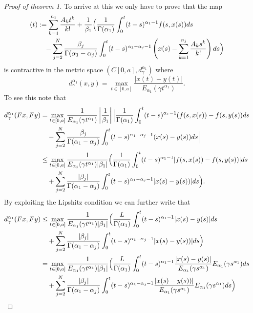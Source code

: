 \documentclass{article}
\begin{document}
\begin{proof}[Proof of theorem 1]

	To arrive at this we only have to prove that the map
	\begin{align*}
		[Fx](t) &:= \sum_{k=1}^{n_1}\frac{A_kt^k}{k!} + \frac{1}{\beta_1} \Bigl( \frac{1}{\Gamma(\alpha_1)}\int_{0}^{t} (t-s)^{\alpha_1 - 1}f(s,x(s))ds \\
			& \ \ \ - \sum_{j=2}^{N} \frac{\beta_j}{\Gamma(\alpha_1 - \alpha_j)}\int_{0}^{t}(t-s)^{\alpha_1 - \alpha_j - 1}\left(x(s) - \sum_{k=1}^{n_j}\frac{A_ks^k}{k!} \right) ds \Bigr)
	\end{align*}
	is contractive in the metric space $ \left( C[0,a], d^{\alpha_1}_\gamma \right) $ where 
	$$ d_\gamma^{\alpha_1}(x,y) = \max_{t \in [0, a]} \frac{|x(t) - y(t)|}{E_{\alpha_1}(\gamma t^{\alpha_1})}. $$
	To see this note that
	\begin{align*}
		d_\gamma^{\alpha_1}(Fx,Fy) &= \max_{t \in [0, a]}  \frac{1}{E_{\alpha_1}(\gamma t^{\alpha_1})} 
			\left| \frac{1}{\beta_1} \right| \Bigl| \frac{1}{\Gamma(\alpha_1)}\int_0^t (t-s)^{\alpha_1 - 1} (f(s,x(s)) - f(s,y(s))ds \\ 
			& \ \ \ - \sum_{j=2}^N \frac{\beta_j}{\Gamma(\alpha_1 - \alpha_j)} \int_0^t (t-s)^{\alpha_1 - \alpha_j - 1}(x(s) - y(s)) ds \Bigr| \\
			&\leq \max_{t \in [0, a]} \frac{1}{E_{\alpha_1}(\gamma t^{\alpha_1}) | \beta_1 |} \Big(
			 \frac{1}{\Gamma(\alpha_1)}\int_0^t (t-s)^{\alpha_1 - 1} |f(s,x(s)) - f(s,y(s))|ds \\ 
			& \ \ \ + \sum_{j=2}^N \frac{|\beta_j|}{\Gamma(\alpha_1 - \alpha_j)} \int_0^t (t-s)^{\alpha_1 - \alpha_j - 1}|x(s) - y(s))| ds \Bigr).
	\end{align*}
	By exploiting the Lipshitz condition we can further write that 
	\begin{align*}
		d_\gamma^{\alpha_1}(Fx,Fy) &\leq \max_{t \in [0, a]} \frac{1}{E_{\alpha_1}(\gamma t^{\alpha_1})|\beta_1|} \Bigl(
			\frac{L}{\Gamma(\alpha_1)}\int_0^t (t-s)^{\alpha_1 - 1} |x(s) - y(s)|ds \\ 
			& \ \ \ + \sum_{j=2}^N \frac{|\beta_j|}{\Gamma(\alpha_1 - \alpha_j)} \int_0^t (t-s)^{\alpha_1 - \alpha_j - 1}|x(s) - y(s))| ds \Bigr) \\
			&= \max_{t \in [0, a]} \frac{1}{E_{\alpha_1}(\gamma t^{\alpha_1})|\beta_1|} \Bigl(
			\frac{L}{\Gamma(\alpha_1)}\int_0^t (t-s)^{\alpha_1 - 1} \frac{|x(s) - y(s)|}{E_{\alpha_1}(\gamma s^{\alpha_1})}E_{\alpha_1}(\gamma s^{\alpha_1})ds \\ 
			& \ \ \ + \sum_{j=2}^N \frac{|\beta_j|}{\Gamma(\alpha_1 - \alpha_j)} \int_0^t (t-s)^{\alpha_1 - \alpha_j - 1}\frac{|x(s) - y(s))|}{E_{\alpha_1}(\gamma s^{\alpha_1})}E_{\alpha_1}(\gamma s^{\alpha_1}) ds \Bigr) \\

\end{align*}
\end{proof}
\end{document}

